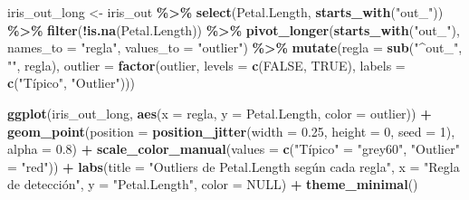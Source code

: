\documentclass[
]{article}
\newenvironment{Shaded}{\begin{snugshade}}{\end{snugshade}}
\newcommand{\AttributeTok}[1]{\textcolor[rgb]{0.13,0.29,0.53}{#1}}
\newcommand{\ConstantTok}[1]{\textcolor[rgb]{0.56,0.35,0.01}{#1}}
\newcommand{\DecValTok}[1]{\textcolor[rgb]{0.00,0.00,0.81}{#1}}
\newcommand{\FloatTok}[1]{\textcolor[rgb]{0.00,0.00,0.81}{#1}}
\newcommand{\FunctionTok}[1]{\textcolor[rgb]{0.13,0.29,0.53}{\textbf{#1}}}
\newcommand{\NormalTok}[1]{#1}
\newcommand{\OtherTok}[1]{\textcolor[rgb]{0.56,0.35,0.01}{#1}}
\newcommand{\SpecialCharTok}[1]{\textcolor[rgb]{0.81,0.36,0.00}{\textbf{#1}}}
\newcommand{\StringTok}[1]{\textcolor[rgb]{0.31,0.60,0.02}{#1}}
\begin{document}
\begin{Shaded}
\begin{Highlighting}[]
\NormalTok{iris\_out\_long }\OtherTok{\textless{}{-}}\NormalTok{ iris\_out }\SpecialCharTok{\%\textgreater{}\%}
  \FunctionTok{select}\NormalTok{(Petal.Length, }\FunctionTok{starts\_with}\NormalTok{(}\StringTok{"out\_"}\NormalTok{)) }\SpecialCharTok{\%\textgreater{}\%}
  \FunctionTok{filter}\NormalTok{(}\SpecialCharTok{!}\FunctionTok{is.na}\NormalTok{(Petal.Length)) }\SpecialCharTok{\%\textgreater{}\%}
  \FunctionTok{pivot\_longer}\NormalTok{(}\FunctionTok{starts\_with}\NormalTok{(}\StringTok{"out\_"}\NormalTok{), }\AttributeTok{names\_to =} \StringTok{"regla"}\NormalTok{, }\AttributeTok{values\_to =} \StringTok{"outlier"}\NormalTok{) }\SpecialCharTok{\%\textgreater{}\%}
  \FunctionTok{mutate}\NormalTok{(}\AttributeTok{regla =} \FunctionTok{sub}\NormalTok{(}\StringTok{"\^{}out\_"}\NormalTok{, }\StringTok{""}\NormalTok{, regla),}
         \AttributeTok{outlier =} \FunctionTok{factor}\NormalTok{(outlier, }\AttributeTok{levels =} \FunctionTok{c}\NormalTok{(}\ConstantTok{FALSE}\NormalTok{, }\ConstantTok{TRUE}\NormalTok{),}
                          \AttributeTok{labels =} \FunctionTok{c}\NormalTok{(}\StringTok{"Típico"}\NormalTok{, }\StringTok{"Outlier"}\NormalTok{)))}

\FunctionTok{ggplot}\NormalTok{(iris\_out\_long, }\FunctionTok{aes}\NormalTok{(}\AttributeTok{x =}\NormalTok{ regla, }\AttributeTok{y =}\NormalTok{ Petal.Length, }\AttributeTok{color =}\NormalTok{ outlier)) }\SpecialCharTok{+}
  \FunctionTok{geom\_point}\NormalTok{(}\AttributeTok{position =} \FunctionTok{position\_jitter}\NormalTok{(}\AttributeTok{width =} \FloatTok{0.25}\NormalTok{, }\AttributeTok{height =} \DecValTok{0}\NormalTok{, }\AttributeTok{seed =} \DecValTok{1}\NormalTok{),}
             \AttributeTok{alpha =} \FloatTok{0.8}\NormalTok{) }\SpecialCharTok{+}
  \FunctionTok{scale\_color\_manual}\NormalTok{(}\AttributeTok{values =} \FunctionTok{c}\NormalTok{(}\StringTok{"Típico"} \OtherTok{=} \StringTok{"grey60"}\NormalTok{, }\StringTok{"Outlier"} \OtherTok{=} \StringTok{"red"}\NormalTok{)) }\SpecialCharTok{+}
  \FunctionTok{labs}\NormalTok{(}\AttributeTok{title =} \StringTok{"Outliers de Petal.Length según cada regla"}\NormalTok{,}
       \AttributeTok{x =} \StringTok{"Regla de detección"}\NormalTok{, }\AttributeTok{y =} \StringTok{"Petal.Length"}\NormalTok{, }\AttributeTok{color =} \ConstantTok{NULL}\NormalTok{) }\SpecialCharTok{+}
  \FunctionTok{theme\_minimal}\NormalTok{()}
\end{Highlighting}
\end{Shaded}
\end{document}
